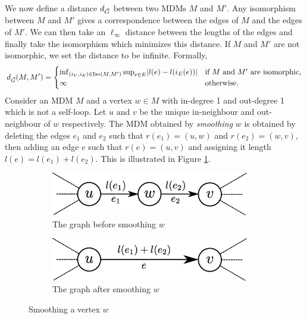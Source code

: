 We now define a distance $d_{\vec{G}}$ between two MDMs $M$ and $M'$.  Any isomorphism between $M$ and $M'$ gives a correspondence between the edges of $M$ and the edges of $M'$. We can then take an $\ell_{\infty}$ distance between the lengths of the edges and finally take the isomorphism which minimizes this distance. If $M$ and $M'$ are not isomorphic, we set the distance to be infinite. Formally,
\begin{equation*}
    d_{\vec{G}}(M, M') = \begin{cases}
        \inf_{(i_V, i_E) \in \operatorname{Iso}(M, M')} \sup_{e \in E} \lvert l(e) - l(i_E(e))\rvert & \text{if $M$ and $M'$ are isomorphic,} \\
        \infty & \text{otherwise.}
    \end{cases}
\end{equation*}
Consider an MDM $M$ and a vertex $w \in M$ with in-degree 1 and out-degree 1 which is not a self-loop. Let $u$ and $v$ be the unique in-neighbour and out-neighbour of $w$ respectively. The MDM obtained by \emph{smoothing} $w$ is obtained by deleting the edges $e_1$ and $e_2$ such that $r(e_1) = (u, w)$ and $r(e_2) = (w, v)$, then adding an edge $e$ such that $r(e) = (u, v)$ and assigning it length $l(e) = l(e_1) + l(e_2)$. This is illustrated in Figure \ref{fig:smoothing}. 
\begin{figure}[htbp]
    \centering
    \begin{subfigure}[htbp]{0.45\textwidth}
        \centering
        \includegraphics[width=0.95\textwidth]{Content/Pictures/smoothing1.eps}
        \caption{The graph before smoothing $w$}
    \end{subfigure}
    \hfill
    \begin{subfigure}[htbp]{0.45\textwidth}
        \centering
        \includegraphics[width=0.95\textwidth]{Content/Pictures/smoothing2.eps}
        \caption{The graph after smoothing $w$}
    \end{subfigure}
    \caption{Smoothing a vertex $w$}
    \label{fig:smoothing}
\end{figure}

